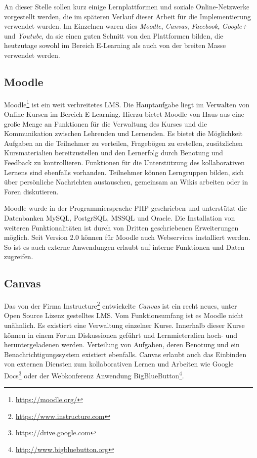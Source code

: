 An dieser Stelle sollen kurz einige Lernplattformen und soziale Online-Netzwerke vorgestellt werden, die im späteren Verlauf dieser Arbeit für die Implementierung verwendet wurden. Im Einzelnen waren dies \emph{Moodle}, \emph{Canvas}, \emph{Facebook}, \emph{Google+} und \emph{Youtube}, da sie einen guten Schnitt von den Plattformen bilden, die heutzutage sowohl im Bereich E-Learning als auch von der breiten Masse verwendet werden.

\subsection{Moodle} %
\label{sub:moodle}

Moodle\footnote{\url{https://moodle.org/}} ist ein weit verbreitetes LMS. Die Hauptaufgabe liegt im Verwalten von Online-Kursen im Bereich E-Learning. Hierzu bietet Moodle von Haus aus eine große Menge an Funktionen für die Verwaltung des Kurses und die Kommunikation zwischen Lehrenden und Lernenden. Es bietet die Möglichkeit Aufgaben an die Teilnehmer zu verteilen, Fragebögen zu erstellen, zusätzlichen Kursmaterialien bereitzustellen und den Lernerfolg durch Benotung und Feedback zu kontrollieren. Funktionen für die Unterstützung des kollaborativen Lernens sind ebenfalls vorhanden. Teilnehmer können Lerngruppen bilden, sich über persönliche Nachrichten austauschen, gemeinsam an Wikis arbeiten oder in Foren diskutieren. 

Moodle wurde in der Programmiersprache PHP geschrieben und unterstützt die  Datenbanken MySQL, PostgrSQL, MSSQL und Oracle. Die Installation von weiteren Funktionalitäten ist durch von Dritten geschriebenen Erweiterungen möglich. Seit Version 2.0 können für Moodle auch Webservices installiert werden. So ist es auch externe Anwendungen erlaubt auf interne Funktionen und Daten zugreifen.


\subsection{Canvas} %
\label{sub:canvas}

Das von der Firma Instructure\footnote{\url{https://www.instructure.com}} entwickelte \emph{Canvas} ist ein recht neues, unter Open Source Lizenz gestelltes LMS. Vom Funktionsumfang ist es Moodle nicht unähnlich. Es existiert eine Verwaltung einzelner Kurse. Innerhalb dieser Kurse können in einem Forum Diskussionen geführt und Lernmieteralien hoch- und heruntergeladenen werden. Verteilung von Aufgaben, deren Benotung und ein Benachrichtigungssystem existiert ebenfalls. Canvas erlaubt auch das Einbinden von externen Diensten zum kollaborativen Lernen und Arbeiten wie Google Docs\footnote{\url{https://drive.google.com}} oder der Webkonferenz Anwendung BigBlueButton\footnote{\url{http://www.bigbluebutton.org}}.

